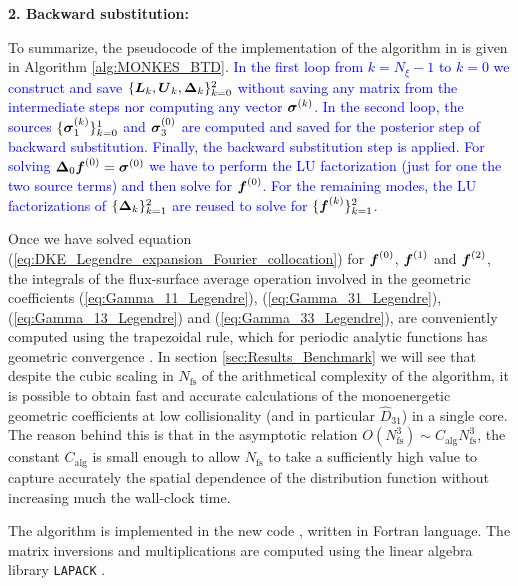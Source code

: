 \begin{algorithm}
\begin{algorithmic}
		\EndFor
		
		
		
		\State{}
	\end{algorithmic}
	
	\textbf{2. Backward substitution:}
	\begin{algorithmic}%
		\EndFor
	\end{algorithmic}
\end{algorithm}


To summarize, the pseudocode of the implementation of the algorithm in {\MONKES} is given in Algorithm \ref{alg:MONKES_BTD}. \textcolor{blue}{In the first loop from $k=N_\xi-1$ to $k=0$ we construct and save $\{\vb*{L}_k,\vb*{U}_k, \vb*{\Delta}_k\}_{k=0}^{2}$ without saving any matrix from the intermediate steps nor computing any vector $\vb*{\sigma}^{(k)}$. In the second loop, the sources $\{\vb*{\sigma}_1^{(k)}\}_{k=0}^{1}$ and $\vb*{\sigma}_3^{(0)}$ are computed and saved for the posterior step of backward substitution. Finally, the backward substitution step is applied. For solving $\vb*{\Delta}_0 \vb*{f}^{(0)} = \vb*{\sigma}^{(0)}$ we have to perform the LU factorization (just for one the two source terms) and then solve for $\vb*{f}^{(0)}$. For the remaining modes, the LU factorizations of $\{\vb*{\Delta}_k\}_{k=1}^{2}$ are reused to solve for $\{\vb*{f}^{(k)}\}_{k=1}^{2}$.}

Once we have solved equation (\ref{eq:DKE_Legendre_expansion_Fourier_collocation}) for $\vb*{f}^{(0)}$, $\vb*{f}^{(1)}$ and $\vb*{f}^{(2)}$, the integrals of the flux-surface average operation involved in the geometric coefficients (\ref{eq:Gamma_11_Legendre}), (\ref{eq:Gamma_31_Legendre}), (\ref{eq:Gamma_13_Legendre}) and (\ref{eq:Gamma_33_Legendre}), are conveniently computed using the trapezoidal rule, which for periodic analytic functions has geometric convergence \cite{Trapezoidal}. In section \ref{sec:Results_Benchmark} we will see that despite the cubic scaling in $N_{\text{fs}}$ of the arithmetical complexity of the algorithm, it is possible to obtain fast and accurate calculations of the monoenergetic geometric coefficients at low collisionality (and in particular $\widehat{D}_{31}$) in a single core. The reason behind this is that in the asymptotic relation $O(N_{\text{fs}}^3)\sim C_{\text{alg}} N_{\text{fs}}^3$, the constant $C_{\text{alg}}$ is small enough to allow $N_{\text{fs}}$ to take a sufficiently high value to capture accurately the spatial dependence of the distribution function without increasing much the wall-clock time. 

The algorithm is implemented in the new code {\MONKES}, written in Fortran language. The matrix inversions and multiplications are computed using the linear algebra library \texttt{LAPACK} \cite{lapack99}.